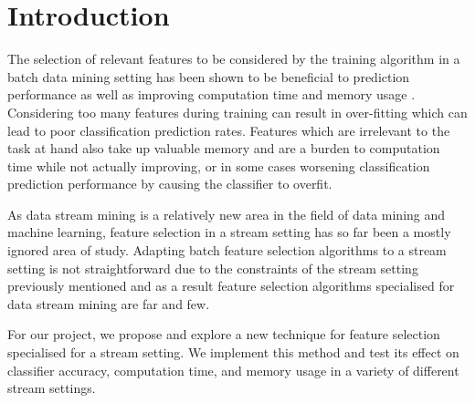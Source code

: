 \chapter{Introduction}
\label{chapter:Introduction}

The selection of relevant features to be considered by the training algorithm in a batch data mining setting has been shown to be beneficial to prediction performance as well as improving computation time and memory usage \citep{Hall98correlation-basedfeature}. Considering too many features during training can result in over-fitting which can lead to poor classification prediction rates. Features which are irrelevant to the task at hand also take up valuable memory and are a burden to computation time while not actually improving, or in some cases worsening classification prediction performance by causing the classifier to overfit.

As data stream mining is a relatively new area in the field of data mining and machine learning, feature selection in a stream setting has so far been a mostly ignored area of study. Adapting batch feature selection algorithms to a stream setting is not straightforward due to the constraints of the stream setting previously mentioned and as a result feature selection algorithms specialised for data stream mining are far and few.

For our project, we propose and explore a new technique for feature selection specialised for a stream setting. We implement this method and test its effect on classifier accuracy, computation time, and memory usage in a variety of different stream settings.
